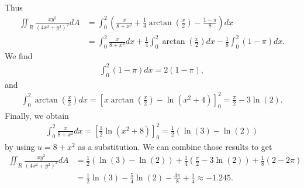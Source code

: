 \documentclass{article}
\begin{document}
Thus
\begin{align*}
  \iint_R\frac{xy^2}{(4x^2+y^2)^2}dA&=\int_0^2\left(\frac{x}{8+x^2}+\frac{1}{4}\arctan\left(\frac{x}{2}\right)
  -\frac{1-\pi}{8}\right)dx\\
  &=\int_0^2 \frac{x}{8+x^2}dx + \frac{1}{4}\int_0^2\arctan\left(\frac{x}{2}\right)dx-\frac{1}{8}\int_0^2 (1-\pi)dx.
\end{align*}
We find 
\begin{align*}
  \int_0^2 (1-\pi)dx = 2(1-\pi),
\end{align*}
and
\begin{align*}
  \int_0^2 \arctan\left(\frac{x}{2}\right)dx
  =\left[x\arctan\left(\frac{x}{2}\right)
  -\ln (x^2+4)\right]^2_0=
  \frac{\pi}{2}-3\ln(2).
\end{align*}
Finally, we obtain
\begin{align*}
  \int_0^2\frac{x}{8+x^2}dx=\left[\frac{1}{2}\ln(x^2+8)\right]_0^2=\frac{1}{2}\left(\ln(3)-\ln(2)\right)
\end{align*}
by using $u=8+x^2$ as a substitution. We can combine those results
to get
\begin{align*}
  \iint_R\frac{xy^2}{(4x^2+y^2)^2}dA
  &=\frac{1}{2}\left(\ln(3)-\ln(2)\right)
  +\frac{1}{4}\left(\frac{\pi}{2}-3\ln(2)\right)
  +\frac{1}{8}(2 - 2\pi)\\
  &=\frac{1}{2}\ln(3)-\frac{5}{4}\ln(2)-\frac{3\pi}{8}+\frac{1}{4}
  \approx -1.245.
\end{align*}
\end{document}
